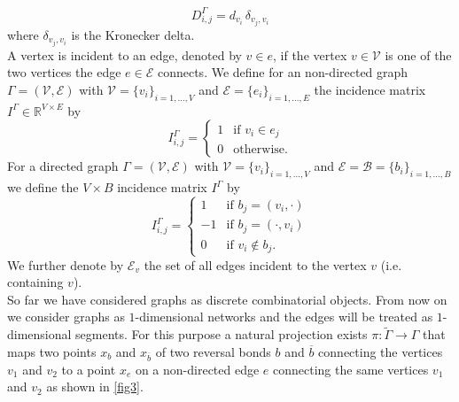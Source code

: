 \begin{equation}
    \label{degree matrix}
    D^{\Gamma}_{i, j} = d_{v_i} \, \delta_{v_j, v_i}
\end{equation}
where $\delta_{v_j, v_i}$ is the Kronecker delta. \\
A vertex is incident to an edge, denoted by $v \in e$, if the vertex $v \in \mathcal{V}$ is one of the two vertices the edge $e \in \mathcal{E}$ connects. We define for an non-directed graph $\Gamma = (\mathcal{V}, \mathcal{E})$ with $\mathcal{V} = \{v_i\}_{i = 1, \ldots, V}$ and $\mathcal{E} = \{e_i\}_{i = 1, \ldots, E}$ the incidence matrix $I^{\Gamma} \in \mathbb{R}^{V \times E}$ by  
\begin{equation}
    \label{incidence matrix non-directed}
    I^{\Gamma}_{i, j}= \begin{cases} 1 & \text{if } v_i \in e_j \\ 0 & \text{otherwise.} \end{cases}
\end{equation}
For a directed graph $\Gamma = (\mathcal{V}, \mathcal{E})$ with $\mathcal{V} = \{v_i\}_{i = 1, \ldots, V}$ and $\mathcal{E} = \mathcal{B} = \{b_i\}_{i = 1, \ldots, B}$ we define the $V \times B$ incidence matrix $I^{\Gamma}$ by 
\begin{equation}
    \label{incidence matrix directed}
    I^{\Gamma}_{i, j}= \begin{cases} 1 & \text{if } b_j = (v_i, \cdot) \\ -1 & \text{if } b_j = (\cdot, v_i) \\ 0 & \text{if } v_i \notin b_j. \end{cases}
\end{equation}
We further denote by $\mathcal{E}_v$ the set of all edges incident to the vertex $v$ (i.e. containing $v$). \\

So far we have considered graphs as discrete combinatorial objects. From now on we consider graphs as $1$-dimensional networks and the edges will be treated as $1$-dimensional segments. For this purpose a natural projection exists $\pi \colon \widetilde{\Gamma} \to \Gamma$ that maps two points $x_b$ and $x_{\overline{b}}$ of two reversal bonds $b$ and $\overline{b}$ connecting the vertices $v_1$ and $v_2$ to a point $x_e$ on a non-directed edge $e$ connecting the same vertices $v_1$ and $v_2$ as shown in \cref{fig3}.


